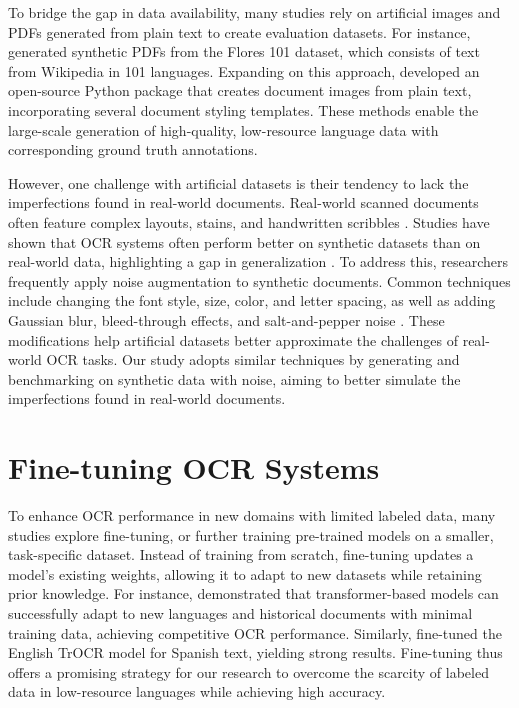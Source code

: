 \documentclass[12pt,oneside]{memoir}
\begin{document}
To bridge the gap in data availability, many studies rely on artificial images and PDFs generated from plain text to create evaluation datasets.
For instance, \textcite{ignat-etal-2022} generated synthetic PDFs from the Flores 101 dataset, which consists of text from Wikipedia in 101 languages.
Expanding on this approach, \textcite{gupte-etal-2021} developed an open-source Python package that creates document images from plain text, incorporating several document styling templates.
These methods enable the large-scale generation of high-quality, low-resource language data with corresponding ground truth annotations.

However, one challenge with artificial datasets is their tendency to lack the imperfections found in real-world documents. 
Real-world scanned documents often feature complex layouts, stains, and handwritten scribbles \parencite{hegghammer-2022}. 
Studies have shown that OCR systems often perform better on synthetic datasets than on real-world data, highlighting a gap in generalization \parencite{ignat-etal-2022}.
To address this, researchers frequently apply noise augmentation to synthetic documents. 
Common techniques include changing the font style, size, color, and letter spacing, as well as adding Gaussian blur, bleed-through effects, and salt-and-pepper noise \parencite{gupte-etal-2021, ignat-etal-2022}.
These modifications help artificial datasets better approximate the challenges of real-world OCR tasks.
Our study adopts similar techniques by generating and benchmarking on synthetic data with noise, aiming to better simulate the imperfections found in real-world documents.

\section{Fine-tuning OCR Systems}

To enhance OCR performance in new domains with limited labeled data, many studies explore fine-tuning, or further training pre-trained models on a smaller, task-specific dataset. 
Instead of training from scratch, fine-tuning updates a model's existing weights, allowing it to adapt to new datasets while retaining prior knowledge. 
For instance, \textcite{parres-and-paredes-2023} demonstrated that transformer-based models can successfully adapt to new languages and historical documents with minimal training data, achieving competitive OCR performance.
Similarly, \textcite{laurent-and-lauar-2024} fine-tuned the English TrOCR model for Spanish text, yielding strong results.
Fine-tuning thus offers a promising strategy for our research to overcome the scarcity of labeled data in low-resource languages while achieving high accuracy.
\end{document}
